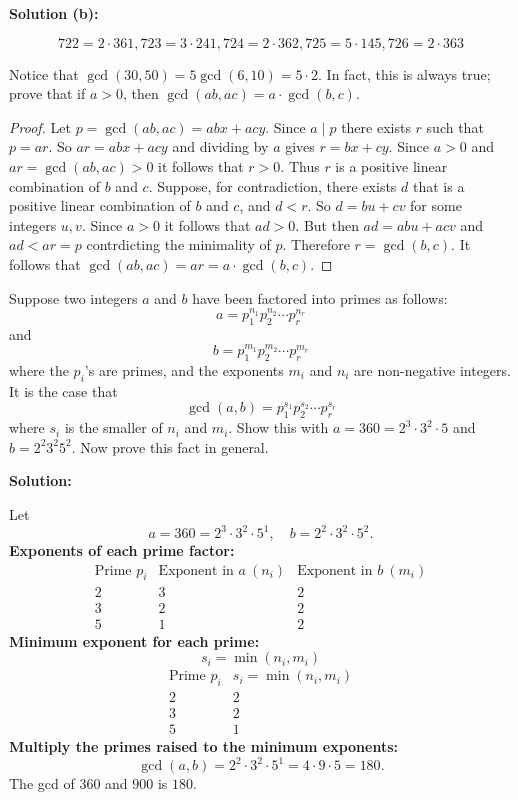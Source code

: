 \textbf{Solution (b):}

\[722 = 2 \cdot 361, 723 = 3 \cdot 241, 724 = 2 \cdot 362, 725 = 5 \cdot 145, 726 = 2 \cdot 363\]

\begin{tcolorbox}[title=Problem 9, breakable]
    Notice that $\gcd(30, 50) = 5\gcd(6, 10) = 5 \cdot 2$. In fact, this is 
    always true; prove that if $a > 0$, then $\gcd(ab, ac) = a \cdot \gcd(b, c)$.
\end{tcolorbox}

\begin{proof}
    Let $p = \gcd(ab, ac) = abx + acy$. Since $a \mid p$ there exists $r$ such that $p = ar$.
    So $ar = abx + acy$ and dividing by $a$ gives $r = bx + cy$. 
    Since $a > 0$
        and $ar = \gcd (ab,ac) > 0$ it follows that $r > 0$. 
    Thus $r$ is a positive linear combination of $b$ and $c$.
    Suppose, for contradiction, there exists $d$ that is a positive linear combination of $b$ and $c$, and $d < r$.
    So $d = bu + cv$ for some integers $u, v$.
    Since $a > 0$ it follows that $ad > 0$.
    But then $ad = abu + acv$ and $ad < ar = p$ contrdicting the minimality of $p$.
    Therefore $r = \gcd(b, c)$.
    It follows that $\gcd(ab, ac) = ar =  a \cdot \gcd(b, c)$.
\end{proof}

\begin{tcolorbox}[title=Problem 10, breakable]
    Suppose two integers $a$ and $b$ have been factored into primes as follows:
    \[a = p_1^{n_1} p_2^{n_2} \cdots p_r^{n_r}\]
    and 
     \[b = p_1^{m_1} p_2^{m_2} \cdots p_r^{m_r}\]
    where the $p_i$'s are primes, and the exponents $m_i$ and $n_i$ are non-negative 
    integers. It is the case that 
    \[\gcd(a, b) = p_1^{s_1} p_2^{s_2} \cdots p_r^{s_r}\]
    where $s_i$ is the smaller of $n_i$ and $m_i$. Show this with $a = 360 = 2^3 \cdot 3^2 \cdot 5$
    and $b = 2^2 3^2 5^2$. Now prove this fact in general.
\end{tcolorbox}

\textbf{Solution:}

Let 
\[
a = 360 = 2^3 \cdot 3^2 \cdot 5^1, \quad
b = 2^2 \cdot 3^2 \cdot 5^2.
\]
\textbf{Exponents of each prime factor:}
\[
\begin{array}{c|c|c}
\text{Prime } p_i & \text{Exponent in } a \ (n_i) & \text{Exponent in } b \ (m_i) \\
\hline
2 & 3 & 2 \\
3 & 2 & 2 \\
5 & 1 & 2
\end{array}
\]
\textbf{Minimum exponent for each prime:}
\[
s_i = \min(n_i, m_i)
\]
\[
\begin{array}{c|c}
\text{Prime } p_i & s_i = \min(n_i, m_i) \\
\hline
2 & 2 \\
3 & 2 \\
5 & 1
\end{array}
\]
\textbf{Multiply the primes raised to the minimum exponents:}
\[
\gcd(a,b) = 2^2 \cdot 3^2 \cdot 5^1 = 4 \cdot 9 \cdot 5 = 180.
\]
The gcd of $360$ and $900$ is $180$.

